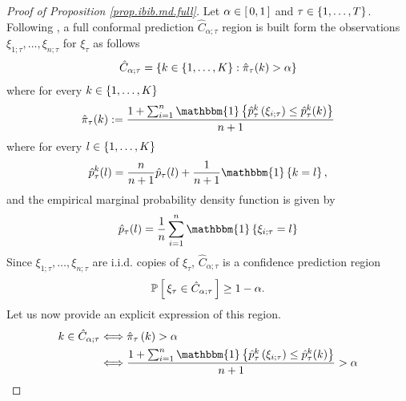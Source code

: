 \documentclass[11pt]{article}
\begin{document}
\begin{proof}[Proof of Proposition \ref{prop.ibib.md.full}]
    Let $\alpha \in \left[\, 0, 1 \,\right]$ and $\tau \in \left\{ 1, \ldots, T \right\}$.
    Following \citet{lei2013distribution},
    a full conformal prediction $\hat{C}_{\alpha; \tau}$ region is built form
    the observations $\xi_{1; \tau}, \ldots, \xi_{n; \tau}$ for $\xi_{\tau}$
    as follows
    \begin{align*}
        \hat{C}_{\alpha; \tau} =
        \left\{ k \in \left\{ 1, \ldots, K \right\}
        : \hat{\pi}_{\tau} (k) > \alpha
     \right\}
    \end{align*}
    where for every $k \in \left\{ 1, \ldots, K \right\}$
    \begin{align*}
        \hat{\pi}_{\tau} (k)
        := \frac{
            1
            + \sum_{i = 1}^{n}
            \mathbbm{1} \brac{
                \hat{p}_{\tau}^{k}\paren{\xi_{i; \tau}}
                \leq \hat{p}^{k}_{\tau}(k)
            }
        }{n+1}
    \end{align*}
    where for every $l \in \left\{ 1, \ldots, K \right\}$
    \begin{align*}
        \hat{p}_{\tau}^{k}(l) = \frac{n}{n+1} \hat{p}_{\tau}(l) + \frac{1}{n+1} \mathbbm{1} \brac{k = l},
        \end{align*}
    and the empirical marginal probability density function is given by
    \begin{align}
        \label{eq.epmf.full}
        \hat{p}_{\tau}(l) = \frac{1}{n} \sum_{i=1}^{n} \mathbbm{1} \brac{\xi_{i; \tau} = l}
    \end{align}
    Since $\xi_{1; \tau}, \ldots, \xi_{n; \tau}$ are i.i.d. copies of $\xi_{\tau}$,
    $\hat{C}_{\alpha; \tau}$ is a confidence prediction region \citep{vovk2005algorithmic}
    \begin{align*}
        \mathbb{P} \left[\, 
            \xi_{\tau} \in \hat{C}_{\alpha; \tau}
         \,\right] \geq 1 - \alpha.
    \end{align*}
    Let us now provide an explicit expression of this region.
    \begin{align*}
        k \in \hat{C}_{\alpha; \tau}
        &
        \Longleftrightarrow \hat{\pi}_{\tau}\paren{k} > \alpha
        \\
        &
        \Longleftrightarrow \frac{
            1
            + \sum_{i = 1}^{n}
            \mathbbm{1} \brac{
                \hat{p}_{\tau}^{k}\paren{\xi_{i; \tau}}
                \leq \hat{p}^{k}_{\tau}(k)
            }
        }{n+1} > \alpha

\end{align*}
\end{proof}
\end{document}
